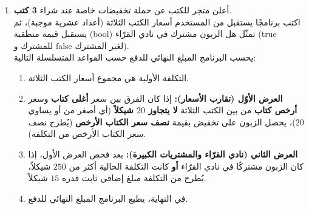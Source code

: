\documentclass[14pt]{extarticle}
\begin{document}
\begin{enumerate}[resume, itemsep=2.2em]
\ifwithsols
\begin{boxSolution}
\begin{english}
\begin{verbatim}
Console.WriteLine("Enter square room area:");
double roomArea = double.Parse(Console.ReadLine());
Console.WriteLine("Enter table radius:");
double tableRadius = double.Parse(Console.ReadLine());

double side = Math.Sqrt(roomArea);
double diameter = 2 * tableRadius;

Console.WriteLine("Room side: " + side);
Console.WriteLine("Table diameter: " + diameter);

if (side - diameter >= 2)
{
    Console.WriteLine("Fits comfortably");
}
else if (side >= diameter)
{
    Console.WriteLine("Fits tightly");
}
else
{
    Console.WriteLine("Does not fit");
}
\end{verbatim}
\end{english}
\end{boxSolution}
\fi
\filbreak

\item
أعلن متجر للكتب عن حملة تخفيضات خاصة عند شراء \textbf{3 كتب}. \\
اكتب برنامجًا يستقبل من المستخدم أسعار الكتب الثلاثة (أعداد عشرية موجبة)، ثم يستقبل قيمة منطقية (\textenglish{bool}) تمثّل هل الزبون مشترك في نادي القرّاء (\textenglish{true} للمشترك و \textenglish{false} لغير المشترك). \\
يحسب البرنامج المبلغ النهائي للدفع حسب القواعد المتسلسلة التالية:
\begin{enumerate}
    \item التكلفة الأولية هي مجموع أسعار الكتب الثلاثة.
    \item \textbf{العرض الأوّل (تقارب الأسعار):} إذا كان الفرق بين سعر \textbf{أغلى كتاب} وسعر \textbf{أرخص كتاب} من بين الكتب الثلاثة \textbf{لا يتجاوز $20$ شيكلاً} (أي أصغر من أو يساوي $20$)، يحصل الزبون على تخفيض بقيمة \textbf{نصف سعر الكتاب الأرخص} (يُطرح نصف سعر الكتاب الأرخص من التكلفة).
    \item \textbf{العرض الثاني (نادي القرّاء والمشتريات الكبيرة):} بعد فحص العرض الأول، إذا كان الزبون مشتركًا في نادي القرّاء \textbf{أو} كانت التكلفة الحالية أكثر من $250$ شيكلاً، يُطرح من التكلفة مبلغ إضافي ثابت قدره $15$ شيكلاً.
    \item في النهاية، يطبع البرنامج المبلغ النهائي للدفع.
\end{enumerate}


\end{enumerate}
\end{document}

